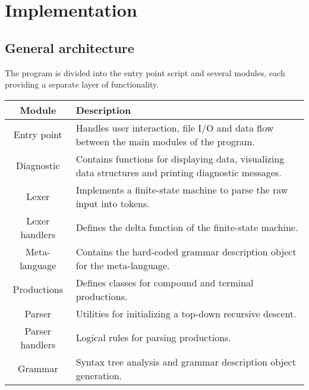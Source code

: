 \documentclass{article}
\begin{document}
	\section{Implementation}

	\subsection{General architecture}

	The program is divided into the entry point script and several modules,
	each providing a separate layer of functionality.

	\begin{center}
	\begin{tabular}{ |c|p{8.5cm}| }
		\hline
			Module & Description \\
		\hline
			Entry point & Handles user interaction, file I/O and data flow between the main modules of the program. \\
		\hline
			Diagnostic & Contains functions for displaying data, visualizing data structures and printing diagnostic messages. \\
		\hline
			Lexer & Implements a finite-state machine to parse the raw input into tokens. \\
		\hline
			Lexer handlers & Defines the delta function of the finite-state machine. \\
		\hline
			Meta-language & Contains the hard-coded grammar description object for the meta-language. \\
		\hline
			Productions & Defines classes for compound and terminal productions. \\
		\hline
			Parser & Utilities for initializing a top-down recursive descent. \\
		\hline
			Parser handlers & Logical rules for parsing productions. \\
		\hline
			Grammar & Syntax tree analysis and grammar description object generation. \\
		\hline
	\end{tabular}
	\end{center}
\end{document}

